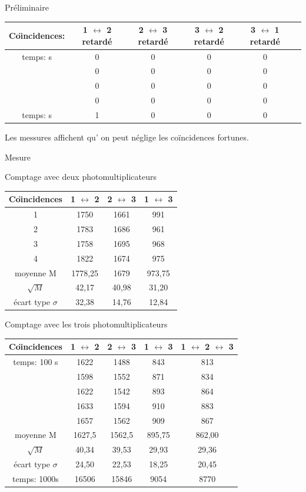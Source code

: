 \documentclass[a4paper,11pt,liststotocnumbered,bibtotocnumbered]{scrartcl}
\begin{document}
\begin{section}{Préliminaire}
  \begin{tabular}{c|c|c|c|c|c}
Co\"{\i}ncidences:	&	1 $\leftrightarrow$ 2 retardé	&	2 $\leftrightarrow$ 3 retardé	&	3 $\leftrightarrow$ 2 retardé	&	3 $\leftrightarrow$ 1 retardé	\\ \hline	

temps:	\unit[10]{s} &	0	&	0	&	0	&	0	\\
	&	0	&	0	&	0	&	0	\\
	&	0	&	0	&	0	&	0	\\
	&	0	&	0	&	0	&	0	\\ \hline
temps: \unit[100]{s}	&	1	&	0	&	0	&	0	\\
\end{tabular}
\newline
Les messures affichent qu' on peut néglige les co\"{i}ncidences fortunes.
 \end{section}


 \begin{section}{Mesure}
\begin{subsection}{Comptage avec deux photomultiplicateurs}
  \begin{tabular}{c|c|c|c}
Co\"{\i}ncidences	&	 1 $\leftrightarrow$ 2	&	2 $\leftrightarrow$ 3	&	 1 $\leftrightarrow$ 3	\\ \hline
1	&	1750	&	1661	&	991	\\
2	&	1783	&	1686	&	961	\\
3	&	1758	&	1695	&	968	\\
4	&	1822	&	1674	&	975	\\ \hline
moyenne M	&	1778,25	&	1679	&	973,75	\\
$\sqrt M$	&	42,17	&	40,98	&	31,20	\\
écart type $\sigma$	&	32,38	&	14,76	&	12,84	\\
\end{tabular}
\end{subsection}
\begin{subsection}{Comptage avec les trois photomultiplicateurs}
\begin{tabular}{c|c|c|c|c}
Co\"{\i}ncidences	&	 1 $\leftrightarrow$ 2	&	 2 $\leftrightarrow$ 3	&	 1 $\leftrightarrow$ 3	&	1 $\leftrightarrow$ 2 $\leftrightarrow$ 3	\\ \hline
temps: 100 s	&	1622	&	1488	&	843	&	813	\\
	&	1598	&	1552	&	871	&	834	\\
	&	1622	&	1542	&	893	&	864	\\
	&	1633	&	1594	&	910	&	883	\\
	&	1657	&	1562	&	909	&	867	\\ \hline
moyenne M	&	1627,5	&	1562,5	&	895,75	&	862,00	\\
$\sqrt M$	&	40,34	&	39,53	&	29,93	&	29,36	\\
écart type $\sigma$	&	24,50	&	22,53	&	18,25	&	20,45	\\ \hline
temps: 1000s	&	16506	&	15846	&	9054	&	8770	\\
\end{tabular}
\end{subsection}
 \end{section}
\end{document}
